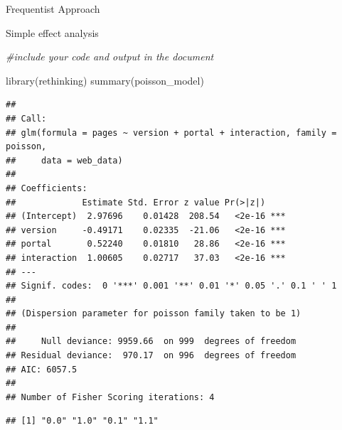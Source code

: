\documentclass[
  ignorenonframetext,
]{beamer}
\newenvironment{Shaded}{\begin{snugshade}}{\end{snugshade}}
\newcommand{\CommentTok}[1]{\textcolor[rgb]{0.56,0.35,0.01}{\textit{#1}}}
\newcommand{\FunctionTok}[1]{\textcolor[rgb]{0.00,0.00,0.00}{#1}}
\newcommand{\NormalTok}[1]{#1}
\newcommand{\OtherTok}[1]{\textcolor[rgb]{0.56,0.35,0.01}{#1}}
\newcommand{\SpecialCharTok}[1]{\textcolor[rgb]{0.00,0.00,0.00}{#1}}
\begin{document}
\begin{frame}[fragile]{Frequentist Approach}
\begin{block}{Simple effect analysis}
\begin{Shaded}
\begin{Highlighting}[]
\CommentTok{\#include your code and output in the document}

\FunctionTok{library}\NormalTok{(rethinking)}
\FunctionTok{summary}\NormalTok{(poisson\_model)}
\end{Highlighting}
\end{Shaded}

\begin{verbatim}
## 
## Call:
## glm(formula = pages ~ version + portal + interaction, family = poisson, 
##     data = web_data)
## 
## Coefficients:
##             Estimate Std. Error z value Pr(>|z|)    
## (Intercept)  2.97696    0.01428  208.54   <2e-16 ***
## version     -0.49171    0.02335  -21.06   <2e-16 ***
## portal       0.52240    0.01810   28.86   <2e-16 ***
## interaction  1.00605    0.02717   37.03   <2e-16 ***
## ---
## Signif. codes:  0 '***' 0.001 '**' 0.01 '*' 0.05 '.' 0.1 ' ' 1
## 
## (Dispersion parameter for poisson family taken to be 1)
## 
##     Null deviance: 9959.66  on 999  degrees of freedom
## Residual deviance:  970.17  on 996  degrees of freedom
## AIC: 6057.5
## 
## Number of Fisher Scoring iterations: 4
\end{verbatim}

\begin{Shaded}
\end{Shaded}

\begin{verbatim}
## [1] "0.0" "1.0" "0.1" "1.1"
\end{verbatim}


\end{block}
\end{frame}
\end{document}
